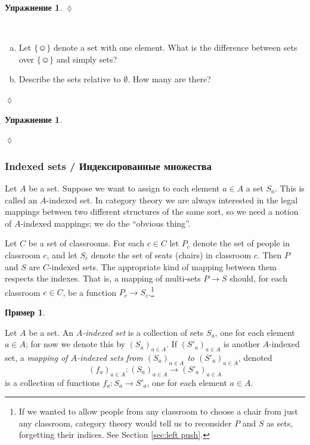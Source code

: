 \documentclass[a4paper]{book}
\def\singleton{\{\smiley\}}
\def\to{\rightarrow}
\def\taking{\colon}
\theoremstyle{myth}
\newtheorem{exampleENG}[envENG]{\begin{english}Example\end{english}}
\newtheorem{excENG}[envENG]{\begin{english}Exercise\end{english}}
\newtheorem{definitionENG}[envENG]{\begin{english}Definition\end{english}}
\newenvironment{exerciseENG}{\begin{excENG}}{\hspace*{\fill}$\lozenge$\end{excENG}}
\newtheorem{exampleRUS}[envRUS]{Пример}
\newtheorem{excRUS}[envRUS]{Упражнение}
\newenvironment{exerciseRUS}{\begin{excRUS}}{\hspace*{\fill}$\lozenge$\end{excRUS}}
\def\sexc{\begin{enumerate}[a.)]\setlength{\itemsep}{.1cm}\setlength{\parskip}{.1cm}\item}
\def\next{\item}
\def\endsexc{\end{enumerate}}
\begin{document}
\begin{russian}
\begin{exerciseRUS}
 
\end{exerciseRUS}

\begin{exerciseENG}~
\sexc Let $\singleton$ denote a set with one element. What is the difference between sets over $\singleton$ and simply sets?
\next Describe the sets relative to $\emptyset$. How many are there?
\endsexc
\end{exerciseENG}

\begin{exerciseRUS}~
 
\end{exerciseRUS}


\subsubsection{Indexed sets / Индексированные множества}\label{sec:indexed sets}

Let $A$ be a set. Suppose we want to assign to each element $a\in A$ a set $S_a$. This is called an $A$-indexed set. In category theory we are always interested in the legal mappings between two different structures of the same sort, so we need a notion of $A$-indexed mappings; we do the “obvious thing”.

 

\begin{exampleENG}\label{ex:classroom seats}
Let $C$ be a set of classrooms. For each $c\in C$ let $P_c$ denote the set of people in classroom $c$, and let $S_c$ denote the set of seats (chairs) in classroom $c$. Then $P$ and $S$ are $C$-indexed sets. The appropriate kind of mapping between them respects the indexes. That is, a mapping of multi-sets $P\to S$ should, for each classroom $c\in C$, be a function $P_c\to S_c$.\footnote{If we wanted to allow people from any classroom to choose a chair from just any classroom, category theory would tell us to reconsider $P$ and $S$ as sets, forgetting their indices. See Section \ref{sec:left push}.}
\end{exampleENG}

\begin{exampleRUS}\label{ex:classroom seats}
 
\end{exampleRUS}

\begin{definitionENG}\label{def:indexed sets}
Let $A$ be a set. An {\em $A$-indexed set} is a collection of sets $S_a$, one for each element $a\in A$; for now we denote this by $(S_a)_{a\in A}$. If $(S'_a)_{a\in A}$ is another $A$-indexed set, a {\em mapping of $A$-indexed sets from $(S_a)_{a\in A}$ to $(S'_a)_{a\in A}$}, denoted $$(f_a)_{a\in A}\taking(S_a)_{a\in A}\to (S'_a)_{a\in A}$$ is a collection of functions $f_a\taking S_a\to S'_a$, one for each element $a\in A$.
\end{definitionENG}


\end{russian}
\end{document}
